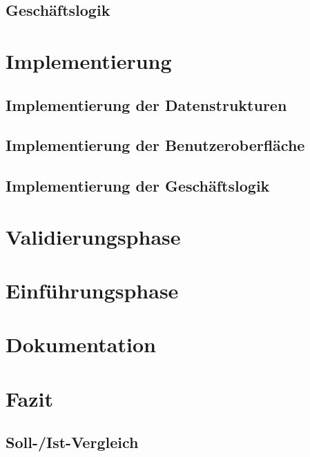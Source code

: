 \documentclass{article}
\begin{document}
\subsection{Geschäftslogik}
\newpage
\section{Implementierung}

\subsection{Implementierung der Datenstrukturen}

\subsection{Implementierung der Benutzeroberfläche}
\subsection{Implementierung der Geschäftslogik}

\section{Validierungsphase}

\section{Einführungsphase}

\section{Dokumentation}

\section{Fazit}

\subsection{Soll-/Ist-Vergleich}
\end{document}
